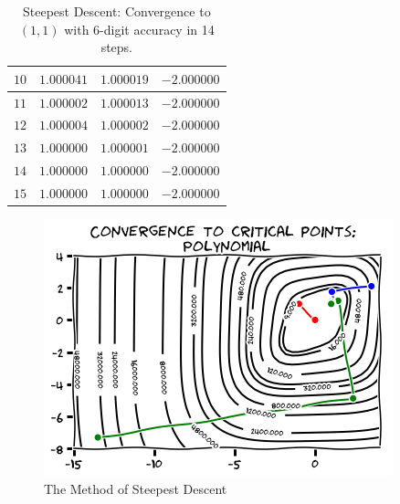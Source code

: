 \begin{example}
\begin{itemize}
\begin{table}[ht!]
\begin{tabular}{|r|r|r|r|}
	$10$ & $1.000041$ & $1.000019$ & $-2.000000$ \\ \hline 
	$11$ & $1.000002$ & $1.000013$ & $-2.000000$ \\ \hline 
	$12$ & $1.000004$ & $1.000002$ & $-2.000000$ \\ \hline 
	$13$ & $1.000000$ & $1.000001$ & $-2.000000$ \\ \hline 
	$14$ & $1.000000$ & $1.000000$ & $-2.000000$ \\ \hline 
	$15$ & $1.000000$ & $1.000000$ & $-2.000000$ \\ \hline 
	\end{tabular}
	\caption{Steepest Descent: Convergence to $(1,1)$ with 6-digit accuracy in 14 steps.}
	\label{table:SD-1-1}
	\end{table}
\end{itemize}
\begin{figure}[ht!]
\includegraphics[width=0.6\linewidth]{convergenceSteepest.png}
\caption{The Method of Steepest Descent}
\label{figure:SteepestConvergence}
\end{figure}
\end{example}

